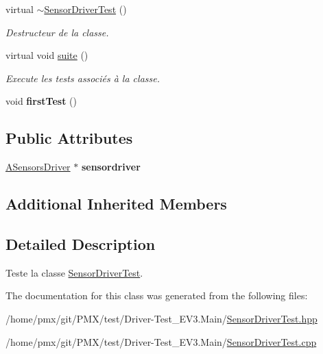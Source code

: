 \begin{DoxyCompactItemize}
\mbox{\label{classtest_1_1SensorDriverTest_af80b73929a3387d977d26dfeb15576cb}} 
virtual \hyperlink{classtest_1_1SensorDriverTest_af80b73929a3387d977d26dfeb15576cb}{$\sim$\+Sensor\+Driver\+Test} ()
\begin{DoxyCompactList}\small\item\em Destructeur de la classe. \end{DoxyCompactList}\item 
\mbox{\label{classtest_1_1SensorDriverTest_a01e6c69bdce29722b52002ff9313e7fc}} 
virtual void \hyperlink{classtest_1_1SensorDriverTest_a01e6c69bdce29722b52002ff9313e7fc}{suite} ()
\begin{DoxyCompactList}\small\item\em Execute les tests associés à la classe. \end{DoxyCompactList}\item 
\mbox{\label{classtest_1_1SensorDriverTest_ab44625e08917c9c1a99c7e7e8967a9bd}} 
void {\bfseries first\+Test} ()
\end{DoxyCompactItemize}
\subsection*{Public Attributes}
\begin{DoxyCompactItemize}
\item 
\mbox{\label{classtest_1_1SensorDriverTest_a846f250330bbae78aa9bf640e6788c43}} 
\hyperlink{classASensorsDriver}{A\+Sensors\+Driver} $\ast$ {\bfseries sensordriver}
\end{DoxyCompactItemize}
\subsection*{Additional Inherited Members}


\subsection{Detailed Description}
Teste la classe \hyperlink{classtest_1_1SensorDriverTest}{Sensor\+Driver\+Test}. 

The documentation for this class was generated from the following files\+:\begin{DoxyCompactItemize}
\item 
/home/pmx/git/\+P\+M\+X/test/\+Driver-\/\+Test\+\_\+\+E\+V3.\+Main/\hyperlink{Driver-Test__EV3_8Main_2SensorDriverTest_8hpp}{Sensor\+Driver\+Test.\+hpp}\item 
/home/pmx/git/\+P\+M\+X/test/\+Driver-\/\+Test\+\_\+\+E\+V3.\+Main/\hyperlink{Driver-Test__EV3_8Main_2SensorDriverTest_8cpp}{Sensor\+Driver\+Test.\+cpp}\end{DoxyCompactItemize}
